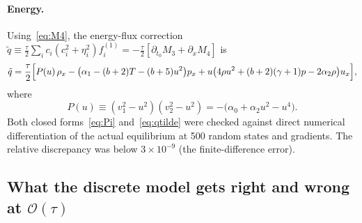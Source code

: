 \documentclass[11pt]{article}
\theoremstyle{remark}
\newcommand{\ord}{\mathcal{O}}
\begin{document}
\paragraph{Energy.}  Using~\eqref{eq:M4}, the energy-flux correction
$\tilde q \equiv \tfrac{\tau}{2}\sum_i c_i(c_i^2+\eta_i^2) f_i^{(1)} = -\tfrac{\tau}{2}[\partial_{t_0}M_3 + \partial_x M_4]$ is
\begin{equation}
  \tilde q = \frac{\tau}{2}\Bigl[P(u)\,\rho_x
   - \bigl(\alpha_1 - (b+2)T - (b+5)u^2\bigr)p_x
   + u\bigl(4\rho u^2 + (b+2)(\gamma+1)p - 2\alpha_2\rho\bigr)u_x\Bigr],
  \label{eq:qtilde}
\end{equation}
where
\begin{equation}
  P(u) \equiv (v_1^2 - u^2)(v_2^2 - u^2) = -\bigl(\alpha_0 + \alpha_2u^2 - u^4\bigr).
  \label{eq:P}
\end{equation}
Both closed forms~\eqref{eq:Pi} and~\eqref{eq:qtilde} were checked against direct
numerical differentiation of the actual equilibrium at 500 random states and
gradients.  The relative discrepancy was below $3\times10^{-9}$ (the finite-difference error).

\subsection{What the discrete model gets right and wrong at $\ord(\tau)$}
\label{sec:ce_compare}
\end{document}

